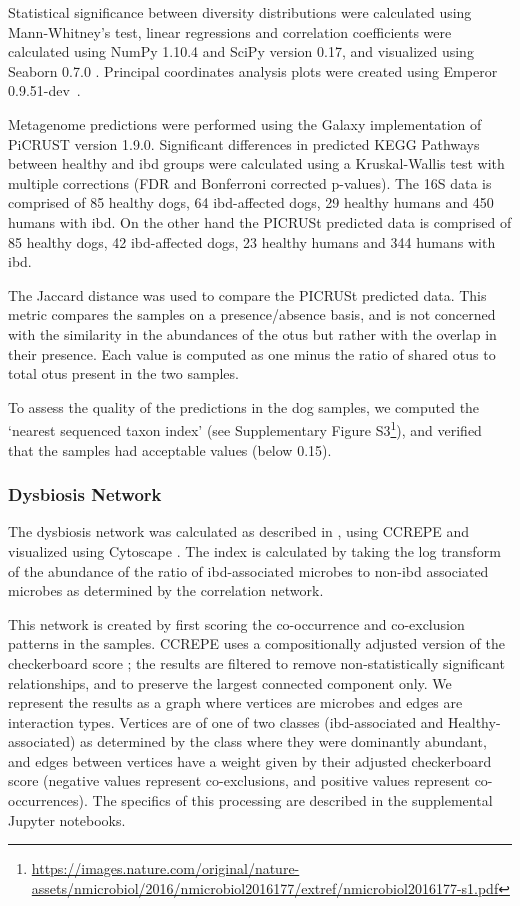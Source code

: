 Statistical significance between diversity distributions were calculated using Mann-Whitney's test, linear regressions and correlation coefficients were calculated using NumPy 1.10.4 \cite{RN3823} and SciPy version 0.17, and visualized using Seaborn 0.7.0 \cite{RN170}. Principal coordinates analysis plots were created using Emperor 0.9.51-dev~\cite{RN79}.

Metagenome predictions were performed using the Galaxy implementation of PiCRUST version 1.9.0. Significant differences in predicted KEGG Pathways between healthy and \gls{ibd} groups were calculated using a Kruskal-Wallis test with multiple corrections (FDR and Bonferroni corrected p-values). The 16S data is comprised of 85 healthy dogs, 64 \gls{ibd}-affected dogs, 29 healthy humans and 450 humans with \gls{ibd}. On the other hand the PICRUSt predicted data is comprised of 85 healthy dogs, 42 \gls{ibd}-affected dogs, 23 healthy humans and 344 humans with \gls{ibd}.

The Jaccard distance was used to compare the PICRUSt predicted data. This metric compares the samples on a presence/absence basis, and is not concerned with the similarity in the abundances of the \glspl{otu} but rather with the overlap in their presence. Each value is computed as one minus the ratio of shared \glspl{otu} to total \glspl{otu} present in the two samples.

To assess the quality of the predictions in the dog samples, we computed the `nearest sequenced taxon index' (see Supplementary Figure S3\footnote{\url{https://images.nature.com/original/nature-assets/nmicrobiol/2016/nmicrobiol2016177/extref/nmicrobiol2016177-s1.pdf}}), and verified that the samples had acceptable values (below 0.15).

\subsubsection{Dysbiosis Network}

The dysbiosis network was calculated as described in \cite{RN154}, using CCREPE \cite{RN168} and visualized using Cytoscape \cite{RN169}. The index is calculated by taking the log transform of the abundance of the ratio of \gls{ibd}-associated microbes to non-\gls{ibd} associated microbes as determined by the correlation network.

This network is created by first scoring the co-occurrence and co-exclusion patterns in the samples. CCREPE uses a compositionally adjusted version of the checkerboard score \cite{RN3985}; the results are filtered to remove non-statistically significant relationships, and to preserve the largest connected component only. We represent the results as a graph where vertices are microbes and edges are interaction types. Vertices are of one of two classes (\gls{ibd}-associated and Healthy-associated) as determined by the class where they were dominantly abundant, and edges between vertices have a weight given by their adjusted checkerboard score (negative values represent co-exclusions, and positive values represent co-occurrences). The specifics of this processing are described in the supplemental Jupyter notebooks.

